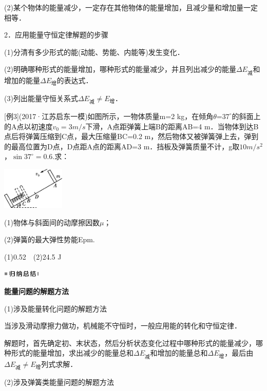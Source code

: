 \documentclass[cn,10.5pt,chinese,mac,chinesefont=founder]{elegantbook}
\begin{document}
(2)某个物体的能量减少，一定存在其他物体的能量增加，且减少量和增加量一定相等．

2．应用能量守恒定律解题的步骤

(1)分清有多少形式的能(动能、势能、内能等)发生变化．

(2)明确哪种形式的能量增加，哪种形式的能量减少，并且列出减少的能量$\Delta E_{\text{减}}$和增加的能量$\Delta E_{\text{增}}$的表达式．

(3)列出能量守恒关系式$\Delta E_{\text{减}}\neq E_{\text{增}}$．

{[}例3{]}(2017·江苏启东一模)如图所示，一物体质量m=2
kg，在倾角$\theta$=$37^\circ$的斜面上的A点以初速度$v_0=3m/s$下滑，A点距弹簧上端B的距离AB=4
m．当物体到达B点后将弹簧压缩到C点，最大压缩量BC=0.2
m，然后物体又被弹簧弹上去，弹到的最高位置为D点，D点距A点的距离AD=3
m．挡板及弹簧质量不计，g取$10m/s^2$，$\sin 37^\circ=0.6$.求：

\begin{center}\includegraphics[width=1.17917in,height=0.79236in]{media/image242.png}\end{center}

(1)物体与斜面间的动摩擦因数$\mu$；

(2)弹簧的最大弹性势能Epm.
\begin{solution}
	(1)0.52　(2)24.5 J
\end{solution}


\begin{center}\includegraphics[width=0.70764in,height=0.12292in]{media/image13.png}

\textbf{能量问题的解题方法}
\end{center}


(1)涉及能量转化问题的解题方法

当涉及滑动摩擦力做功，机械能不守恒时，一般应用能的转化和守恒定律．

解题时，首先确定初、末状态，然后分析状态变化过程中哪种形式的能量减少，哪种形式的能量增加，求出减少的能量总和$\Delta E_{\text{减}}$和增加的能量总和$\Delta E_{\text{增}}$，最后由$\Delta E_{\text{减}}\neq E_{\text{增}}$列式求解．

(2)涉及弹簧类能量问题的解题方法
\end{document}
